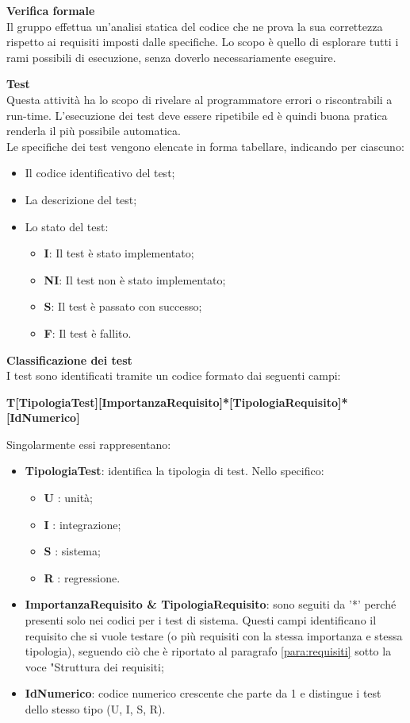 \mbox{}

\textbf{Verifica formale} \\
Il gruppo effettua un'analisi statica del codice che ne prova la sua correttezza rispetto ai requisiti imposti dalle specifiche. Lo scopo è quello di esplorare tutti i rami possibili di esecuzione, senza doverlo necessariamente eseguire. \\

\mbox{}

\textbf{Test} \\
Questa attività ha lo scopo di rivelare al programmatore errori o  riscontrabili a run-time.
L'esecuzione dei test deve essere ripetibile ed è quindi buona pratica renderla il più possibile automatica. \\
Le specifiche dei test vengono elencate in forma tabellare, indicando per ciascuno: 
\begin{itemize}
	\item Il codice identificativo del test;
	\item La descrizione del test;
	\item Lo stato del test:
	\begin{itemize}
		\item \textbf{I}: Il test è stato implementato;
		\item \textbf{NI}: Il test non è stato implementato;
		\item \textbf{S}: Il test è passato con successo;
		\item \textbf{F}: Il test è fallito.
	\end{itemize}
\end{itemize}

\mbox{}

\textbf{Classificazione dei test} \\
I test sono identificati tramite un codice formato dai seguenti campi:
\begin{center}
\textbf{T[TipologiaTest][ImportanzaRequisito]*[TipologiaRequisito]*[IdNumerico]} 
\end{center}
Singolarmente essi rappresentano:
\begin{itemize}
	\item \textbf{TipologiaTest}: identifica la tipologia di test. Nello specifico:
		\begin{itemize}
			\item \textbf{U} : unità;
			\item \textbf{I} : integrazione;
			\item \textbf{S} : sistema;
			\item \textbf{R} : regressione.	 
		\end{itemize}
	\item \textbf{ImportanzaRequisito \& TipologiaRequisito}: sono seguiti da '*' perché presenti solo nei codici per i test di sistema. Questi campi identificano il requisito che si vuole testare (o più requisiti con la stessa importanza e stessa tipologia), seguendo ciò che è riportato al paragrafo \ref{para:requisiti} sotto la voce "Struttura dei requisiti;
	\item \textbf{IdNumerico}: codice numerico crescente che parte da 1 e distingue i test dello stesso tipo (U, I, S, R).
\end{itemize}
 
